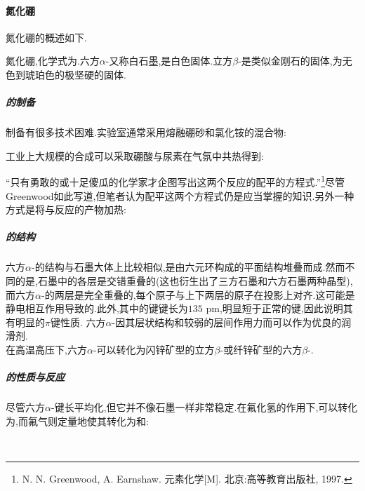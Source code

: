 \documentclass{ctexart}
\begin{document}
\paragraph{氮化硼}
氮化硼的概述如下.
\begin{substance}[\ce{BN}]
    氮化硼,化学式为.六方$\alpha$-又称白石墨,是白色固体.立方$\beta$-是类似金刚石的固体,为无色到琥珀色的极坚硬的固体.
\end{substance}
\subparagraph{的制备}
制备有很多技术困难.实验室通常采用熔融硼砂和氯化铵的混合物:
\begin{center}
\end{center}
工业上大规模的合成可以采取硼酸与尿素在气氛中共热得到:
\begin{center}
\end{center}
“只有勇敢的或十足傻瓜的化学家才企图写出这两个反应的配平的方程式.”\footnote{N. N. Greenwood, A. Earnshaw. 元素化学[M]. 北京:高等教育出版社, 1997.}尽管Greenwood如此写道,但笔者认为配平这两个方程式仍是应当掌握的知识.另外一种方式是将与反应的产物加热:
\begin{center}
\end{center}
\subparagraph{的结构}
六方$\alpha$-的结构与石墨大体上比较相似,是由六元环构成的平面结构堆叠而成.然而不同的是,石墨中的各层是交错重叠的(这也衍生出了三方石墨和六方石墨两种晶型),而六方$\alpha$-的两层是完全重叠的,每个原子与上下两层的原子在投影上对齐.这可能是静电相互作用导致的.此外,其中的键键长为$135\text{ pm}$,明显短于正常的键,因此说明其有明显的$\pi$键性质.
六方$\alpha$-因其层状结构和较弱的层间作用力而可以作为优良的润滑剂.\\
\indent 在高温高压下,六方$\alpha$-可以转化为闪锌矿型的立方$\beta$-或纤锌矿型的六方$\beta$-.
\subparagraph{的性质与反应}
尽管六方$\alpha$-键长平均化,但它并不像石墨一样非常稳定.在氟化氢的作用下,可以转化为,而氟气则定量地使其转化为和:
\begin{center}
    \\
\end{center}
\end{document}
